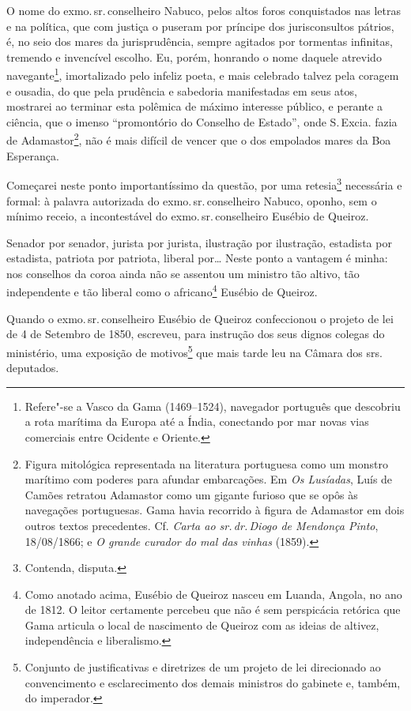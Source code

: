 O nome do exmo.\,sr.\,conselheiro Nabuco, pelos altos foros conquistados
nas letras e na política, que com justiça o puseram por príncipe dos
jurisconsultos pátrios, é, no seio dos mares da jurisprudência, sempre
agitados por tormentas infinitas, tremendo e invencível escolho. Eu,
porém, honrando o nome daquele atrevido navegante\footnote{Refere"-se a
  Vasco da Gama (1469--1524), navegador português que descobriu a rota
  marítima da Europa até a Índia, conectando por mar novas vias
  comerciais entre Ocidente e Oriente.}, imortalizado pelo infeliz
poeta, e mais celebrado talvez pela coragem e ousadia, do que pela
prudência e sabedoria manifestadas em seus atos, mostrarei ao terminar
esta polêmica de máximo interesse público, e perante a ciência, que o
imenso ``promontório do Conselho de Estado'', onde S.\,Excia. fazia de
Adamastor\footnote{Figura mitológica representada na literatura
  portuguesa como um monstro marítimo com poderes para afundar
  embarcações. Em \emph{Os Lusíadas}, Luís de Camões retratou Adamastor
  como um gigante furioso que se opôs às navegações portuguesas. Gama
  havia recorrido à figura de Adamastor em dois outros textos
  precedentes. Cf. \emph{Carta ao sr.\,dr.\,Diogo de Mendonça Pinto},
  18/08/1866; e \emph{O grande curador do mal das vinhas} (1859).}, não
é mais difícil de vencer que o dos empolados mares da Boa Esperança.

Começarei neste ponto importantíssimo da questão, por uma
retesia\footnote{Contenda, disputa.} necessária e formal: à palavra
autorizada do exmo.\,sr.\,conselheiro Nabuco, oponho, sem o mínimo receio,
a incontestável do exmo.\,sr.\,conselheiro Eusébio de Queiroz.

Senador por senador, jurista por jurista, ilustração por ilustração,
estadista por estadista, patriota por patriota, liberal por\ldots{} Neste
ponto a vantagem é minha: nos conselhos da coroa ainda não se assentou
um ministro tão altivo, tão independente e tão liberal como o
africano\footnote{Como anotado acima, Eusébio de Queiroz nasceu em
  Luanda, Angola, no ano de 1812. O leitor certamente percebeu que não é
  sem perspicácia retórica que Gama articula o local de nascimento de
  Queiroz com as ideias de altivez, independência e liberalismo.}
Eusébio de Queiroz.

Quando o exmo.\,sr.\,conselheiro Eusébio de Queiroz confeccionou o projeto
de lei de 4 de Setembro de 1850, escreveu, para instrução dos seus
dignos colegas do ministério, uma exposição de motivos\footnote{
  Conjunto de justificativas e diretrizes de um projeto de lei
  direcionado ao convencimento e esclarecimento dos demais ministros do
  gabinete e, também, do imperador.} que mais tarde leu na Câmara dos
srs.\,deputados.

